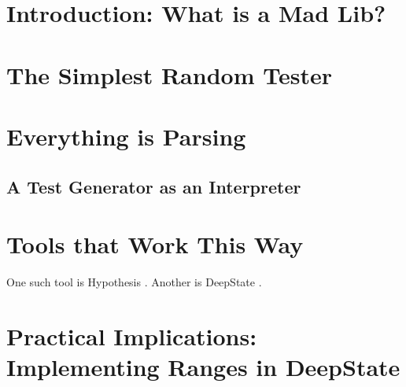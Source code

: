 \documentclass[sigplan,review]{acmart}
\begin{document}
%


%
\maketitle

\section{Introduction: What is a Mad Lib?}

\section{The Simplest Random Tester}

\section{Everything is Parsing}

\subsection{A Test Generator as an Interpreter}

\section{Tools that Work This Way}

One such tool is Hypothesis \cite{hypothesis}.  Another is DeepState \cite{DeepState}.

\section{Practical Implications:  Implementing Ranges in DeepState}






% 
\end{document}
